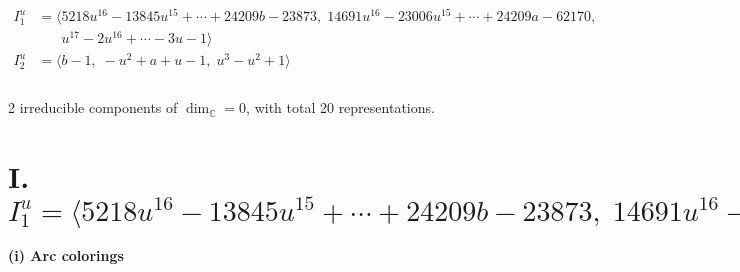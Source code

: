 \documentclass[1p]{elsarticle_modified}
\theoremstyle{definition}
\begin{document}
\begin{align*}
I^u_{1}&=\langle 
5218 u^{16}-13845 u^{15}+\cdots+24209 b-23873,\;14691 u^{16}-23006 u^{15}+\cdots+24209 a-62170,\\
\phantom{I^u_{1}}&\phantom{= \langle  }u^{17}-2 u^{16}+\cdots-3 u-1\rangle \\
I^u_{2}&=\langle 
b-1,\;- u^2+a+u-1,\;u^3- u^2+1\rangle \\
\\
\end{align*}
\raggedright * 2 irreducible components of $\dim_{\mathbb{C}}=0$, with total 20 representations.\\
\newpage
\renewcommand{\arraystretch}{1}
\centering \section*{I. $I^u_{1}= \langle 5218 u^{16}-13845 u^{15}+\cdots+24209 b-23873,\;14691 u^{16}-23006 u^{15}+\cdots+24209 a-62170,\;u^{17}-2 u^{16}+\cdots-3 u-1 \rangle$}
\flushleft \textbf{(i) Arc colorings}\\
\end{document}
